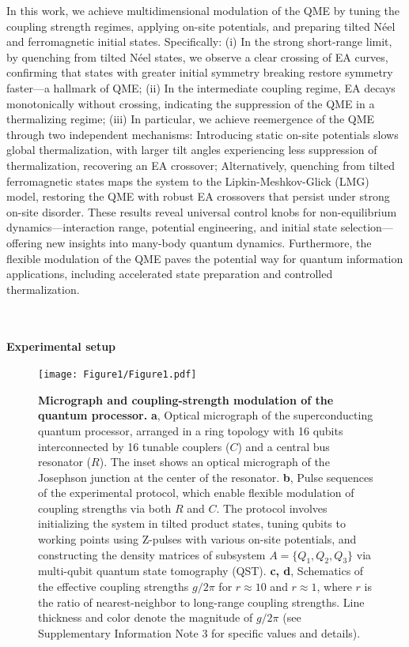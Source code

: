 \documentclass[reprint,superscriptaddress,preprintnumbers,longbibliography,
amsmath,amssymb,aps,floatfix,pra,twocolumn, tightenlines %
]{revtex4-2}
\begin{document}
In this work, we achieve multidimensional modulation of the QME by tuning the coupling strength regimes, applying on-site potentials, and preparing tilted Néel and ferromagnetic initial states. Specifically: (i) In the strong short-range limit, by quenching from tilted Néel states, we observe a clear crossing of EA curves, confirming that states with greater initial symmetry breaking restore symmetry faster—a hallmark of QME; (ii) In the intermediate coupling regime, EA decays monotonically without crossing, indicating the suppression of the QME in a thermalizing regime; (iii) In particular, we achieve reemergence of the QME through two independent mechanisms: Introducing static on-site potentials slows global thermalization, with larger tilt angles experiencing less suppression of thermalization, recovering an EA crossover; Alternatively, quenching from tilted ferromagnetic states maps the system to the Lipkin-Meshkov-Glick (LMG) model, restoring the QME with robust EA crossovers that persist under strong on-site disorder. These results reveal universal control knobs for non-equilibrium dynamics—interaction range, potential engineering, and initial state selection—offering new insights into many-body quantum dynamics. Furthermore, the flexible modulation of the QME paves the potential way for quantum information applications, including accelerated state preparation and controlled thermalization.

    ~\\
	~\\
	\textbf{Experimental setup}
	
     \begin{figure}[t]
         \centering
     	\texttt{[image: Figure1/Figure1.pdf]}
     	\caption{\textbf{Micrograph and coupling-strength modulation of the quantum processor.} \textbf{a}, Optical micrograph of the superconducting quantum processor, arranged in a ring topology with 16 qubits interconnected by 16 tunable couplers ($C$) and a central bus resonator ($R$). The inset shows an optical micrograph of the Josephson junction at the center of the resonator. \textbf{b}, Pulse sequences of the experimental protocol, which enable flexible modulation of coupling strengths via both $R$ and $C$. The protocol involves initializing the system in tilted product states, tuning qubits to working points using Z-pulses with various on-site potentials, and constructing the density matrices of subsystem $ A = \{Q_1, Q_2, Q_3\} $ via multi-qubit quantum state tomography (QST). \textbf{c, d}, Schematics of the effective coupling strengths $ g/2\pi $ for $ r \approx 10 $ and $ r \approx 1 $, where $ r $ is the ratio of nearest-neighbor to long-range coupling strengths. Line thickness and color denote the magnitude of $g/2\pi$ (see Supplementary Information Note 3 for specific values and details). }

	\label{fig1}
     \end{figure}
     
\end{document}
